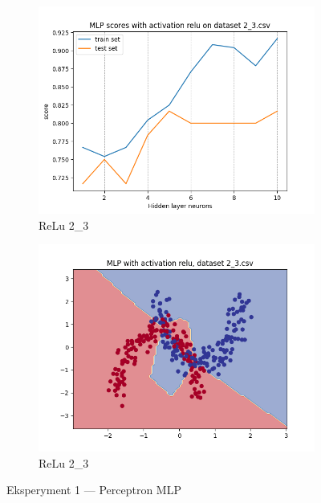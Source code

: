 \documentclass[12pt]{article}
\newcommand*{\subfigwidth}{0.24\textwidth}
\begin{document}
\begin{figure}[H]
\begin{subfigure}[t]{\subfigwidth}
        \includegraphics[width=\linewidth]{img/exp_1/mlp/2_3/relu/scores.png}
        \caption{ReLu 2\_3}
    \end{subfigure}
    \hfill
    \begin{subfigure}[t]{\subfigwidth}
        \includegraphics[width=\linewidth]{img/exp_1/mlp/2_3/relu/boundary.png}
        \caption{ReLu 2\_3}
    \end{subfigure}
    \caption{Eksperyment 1 --- Perceptron MLP}
\end{figure}
\end{document}
